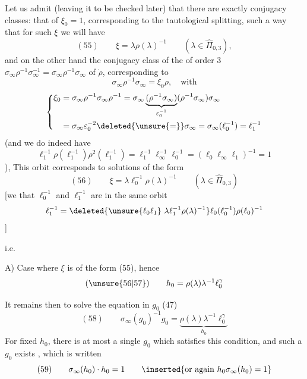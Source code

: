 
Let us admit (leaving it to be checked later) that there are exactly  conjugacy classes: that of $\xi_0=1$, corresponding to the tautological splitting,  such a way that for such $\xi$ we will have
\[
(55)\qquad \xi=\lambda\rho(\lambda)^{-1}
\qquad(\lambda\in\widehat{\Pi}_{0,3}),
\]
and on the other hand the conjugacy class of the  of order 3 $\sigma_\infty\rho^{-1}\sigma_\infty^{-1}=\sigma_\infty\rho^{-1}\sigma_\infty$ of $\dot\rho$, corresponding to
\[
\sigma_\infty\rho^{-1}\sigma_\infty=\xi_0\rho,\quad\text{with}
\]
\[
\left\{\begin{aligned}
\xi_0&=\sigma_\infty\rho^{-1}\sigma_\infty\rho^{-1}
=\sigma_\infty\underbrace{(\rho^{-1}\sigma_\infty)}_{\varepsilon_0^{-1}}(\rho^{-1}\sigma_\infty)\sigma_\infty\\
&=\sigma_\infty\varepsilon_0^{-2}\deleted{\unsure{=}}\sigma_\infty
=\sigma_\infty(\ell_0^{-1})=\ell_1^{-1}
\end{aligned}\right.
\]
(and we do indeed have
\[
\ell_1^{-1}\rho(\ell_1^{-1})\rho^2(\ell_1^{-1})
=\ell_1^{-1}\ell_\infty^{-1}\ell_0^{-1}
=(\ell_0\ell_\infty\ell_1)^{-1}=1
\]
), This orbit corresponds to solutions of the form 
\[
(56)\qquad \xi=\lambda\ell_0^{-1}\rho(\lambda)^{-1}
\qquad(\lambda\in\widehat{\Pi}_{0,3})
\]
[we  that $\ell_0^{-1}$ and $\ell_1^{-1}$ are in the same orbit
\[
\ell_1^{-1}=\deleted{\unsure{\ell_0\ell_1}\ \lambda\ell_1^{-1}\rho(\lambda)^{-1}}
\ell_0(\ell_0^{-1})\rho(\ell_0)^{-1}
\]
]

i.e. 


A) Case  where $\xi$ is of the form (55), hence
\[
(\unsure{56|57})\qquad h_0=\rho(\lambda)\lambda^{-1}\ell_0^\gamma
\]


It remains then to solve the equation in $g_0$ (47)
\[
(58)\qquad
\sigma_\infty(g_0)^{-1}g_0
=\underbrace{\rho(\lambda)\lambda^{-1}\ell_0^\gamma}_{h_0}
\]
For  fixed $h_0$, there is at most a single $g_0$ which satisfies this condition, and such a $g_0$ exists  , which is written
\[
(59)\qquad \sigma_\infty(h_0)\cdot h_0=1
\qquad\inserted{\text{or again }h_0\sigma_\infty(h_0)=1}
\]

